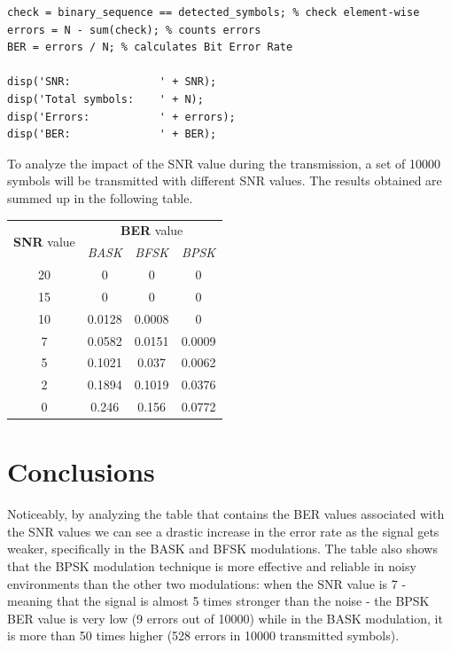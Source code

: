 \begin{lstlisting}
check = binary_sequence == detected_symbols; % check element-wise
errors = N - sum(check); % counts errors
BER = errors / N; % calculates Bit Error Rate

disp('SNR:              ' + SNR);
disp('Total symbols:    ' + N);
disp('Errors:           ' + errors);
disp('BER:              ' + BER);
\end{lstlisting}

\noindent To analyze the impact of the SNR value during the transmission, a set of 10000 symbols will be transmitted with different SNR values. The results obtained are summed up in the following table.

\begin{table}[h!]
    \centering
    \renewcommand{\arraystretch}{1.5}
    \begin{tabular}{|c|c c c|}
        \hline
        \multirow{2}{*}{\textbf{SNR} value} &  \multicolumn{3}{c|}{\textbf{BER} value} \\
        & \textsl{BASK} & \textsl{BFSK} & \textsl{BPSK} \\\hline\hline
        20 & 0 & 0 & 0 \\
        15 & 0 & 0 & 0 \\
        10 & 0.0128 & 0.0008 & 0 \\
        7 & 0.0582 & 0.0151 & 0.0009 \\
        5 & 0.1021 & 0.037 & 0.0062 \\
        2 & 0.1894 & 0.1019 & 0.0376 \\
        0 & 0.246 & 0.156 & 0.0772 \\\hline

    \end{tabular}
    \renewcommand{\arraystretch}{1}
\end{table}

\FloatBarrier\section*{Conclusions}
Noticeably, by analyzing the table that contains the BER values associated with the SNR values we can see a drastic increase in the error rate as the signal gets weaker, specifically in the BASK and BFSK modulations. The table also shows that the BPSK modulation technique is more effective and reliable in noisy environments than the other two modulations: when the SNR value is 7 - meaning that the signal is almost 5 times stronger than the noise - the BPSK BER value is very low (9 errors out of 10000) while in the BASK modulation, it is more than 50 times higher (528 errors in 10000 transmitted symbols).



